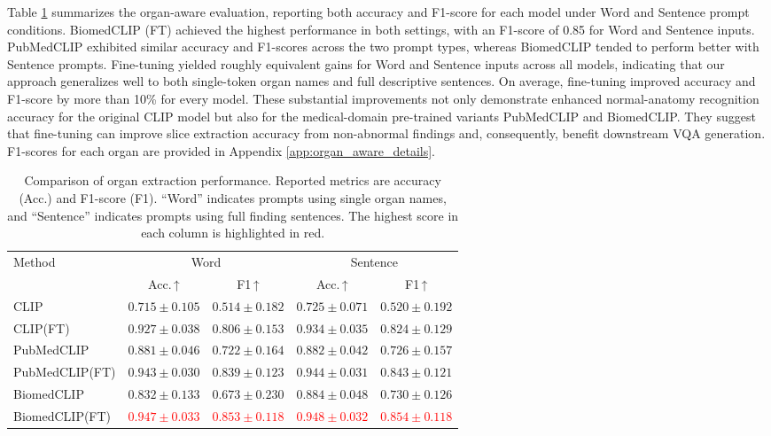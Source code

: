 \documentclass[bioengineering,article,submit,pdftex,moreauthors]{Definitions/mdpi}
\begin{document}
Table \ref{tab:organ_extraction_results} summarizes the organ-aware evaluation, reporting both accuracy and F1-score for each model under Word and Sentence prompt conditions. 
BiomedCLIP (FT) achieved the highest performance in both settings, with an F1-score of 0.85 for Word and Sentence inputs. 
PubMedCLIP exhibited similar accuracy and F1-scores across the two prompt types, whereas BiomedCLIP tended to perform better with Sentence prompts. 
Fine-tuning yielded roughly equivalent gains for Word and Sentence inputs across all models, indicating that our approach generalizes well to both single-token organ names and full descriptive sentences. 
On average, fine-tuning improved accuracy and F1-score by more than 10\% for every model. 
These substantial improvements not only demonstrate enhanced normal-anatomy recognition accuracy for the original CLIP model but also for the medical-domain pre-trained variants PubMedCLIP and BiomedCLIP. 
They suggest that fine-tuning can improve slice extraction accuracy from non-abnormal findings and, consequently, benefit downstream VQA generation.
F1-scores for each organ are provided in Appendix \ref{app:organ_aware_details}.


\begin{table}[ht]
  \centering
  \caption{Comparison of organ extraction performance. Reported metrics are accuracy (Acc.) and F1-score (F1). 
  “Word” indicates prompts using single organ names, and “Sentence” indicates prompts using full finding sentences. 
  The highest score in each column is highlighted in red.}
  \label{tab:organ_extraction_results}
  \begin{tabular}{lcccc}
    \toprule
    \multirow{2}{*}{Method} & \multicolumn{2}{c}{Word}               & \multicolumn{2}{c}{Sentence}           \\
    \cmidrule(lr){2-3}\cmidrule(lr){4-5}
                           & Acc.\,↑ & F1\,↑         & Acc.\,↑   & F1\,↑         \\ 
    \midrule
    CLIP                    & $0.715\pm0.105$ & $0.514\pm0.182$ & $0.725\pm0.071$ & $0.520\pm0.192$ \\
    CLIP(FT)                & $0.927\pm0.038$ & $0.806\pm0.153$ & $0.934\pm0.035$ & $0.824\pm0.129$ \\
    PubMedCLIP              & $0.881\pm0.046$ & $0.722\pm0.164$ & $0.882\pm0.042$ & $0.726\pm0.157$ \\
    PubMedCLIP(FT)          & $0.943\pm0.030$ & $0.839\pm0.123$ & $0.944\pm0.031$ & $0.843\pm0.121$ \\
    BiomedCLIP              & $0.832\pm0.133$ & $0.673\pm0.230$ & $0.884\pm0.048$ & $0.730\pm0.126$ \\
    BiomedCLIP(FT)          & \textcolor{red}{$0.947\pm0.033$} & \textcolor{red}{$0.853\pm0.118$} & \textcolor{red}{$0.948\pm0.032$} & \textcolor{red}{$0.854\pm0.118$} \\
    \bottomrule
  \end{tabular}
\end{table}
\end{document}
